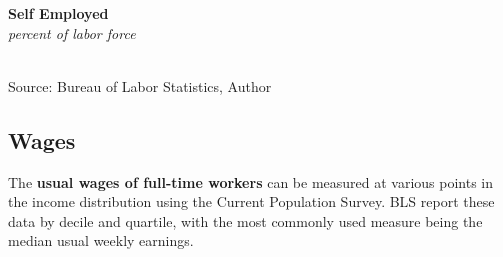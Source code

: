 \documentclass{report}
\makeatletter
\newcommand{\tbllink}[1]{\href{https://raw.githubusercontent.com/bdecon/US-chartbook/master/chartbook/data/#1}{\faTable}}
\newcommand*\short[1]{\expandafter\@gobbletwo\number\numexpr#1\relax}
\newcommand{\absnode}[3]{\node[below right, align=left] at (axis cs: #1,#2) {#3};}
\newcommand{\shdateaxisticks}{
		date coordinates in=x, axis line style={draw=none},
		xmax={2022-03-15},
		max space between ticks=40,	    
		xtick={{1990-01-01}, {1995-01-01}, {2000-01-01}, 
			{2005-01-01}, {2010-01-01}, {2015-01-01}, {2020-01-01}},
		minor xtick={},
		enlarge y limits={0.06}, enlarge x limits={0.01},
		}
\newcommand{\bbar}[2]{extra #1 ticks = {{#2}}, extra #1 tick labels = ,
		extra #1 tick style = {grid=major, grid style={thick, black!25}},}
\newcommand{\stdline}[4]{\addplot[very thick, no markers, color=#1] 
		table [x=#2, y=#3, col sep=comma] {#4};	}
\newcommand{\rbars}{
		\fill[color=black!10] (axis cs:{1990-07-01},\pgfkeysvalueof{/pgfplots/ymin}) rectangle 
			(axis cs:{1991-03-01}, \pgfkeysvalueof{/pgfplots/ymax});
		\fill[color=black!10] (axis cs:{2007-12-01},\pgfkeysvalueof{/pgfplots/ymin}) rectangle 
			(axis cs:{2009-07-01}, \pgfkeysvalueof{/pgfplots/ymax});
		\fill[color=black!10] (axis cs:{2001-03-01},\pgfkeysvalueof{/pgfplots/ymin}) rectangle 
			(axis cs:{2001-11-01}, \pgfkeysvalueof{/pgfplots/ymax});
		\fill[color=black!10] (axis cs:{2020-02-01},\pgfkeysvalueof{/pgfplots/ymin}) rectangle 
			(axis cs:{2020-05-01}, \pgfkeysvalueof{/pgfplots/ymax});}
\makeatother
\begin{document}
{{\begin{minipage}{0.76\textwidth}
\begin{minipage}{0.56\textwidth}
\normalsize \textbf{Self Employed}\\
\footnotesize{\textit{percent of labor force}}\\
\hspace*{-2mm} \\
\footnotesize{Source: Bureau of Labor Statistics, Author} \hfill \tbllink{selfemp.csv} 
\end{minipage} \hfill
\begin{minipage}{0.38\textwidth}
\small 
\end{minipage}
\end{minipage}
\newpage
\begin{minipage}{0.76\textwidth}
\subsection*{Wages}
\hypertarget{labw}{}
\small The \textbf{usual wages of full-time workers} can be measured at various points in the income distribution using the Current Population Survey. BLS report these data by decile and quartile, with the most commonly used measure being the median usual weekly earnings.


\vspace{3mm}


\end{minipage}}}
\end{document}
